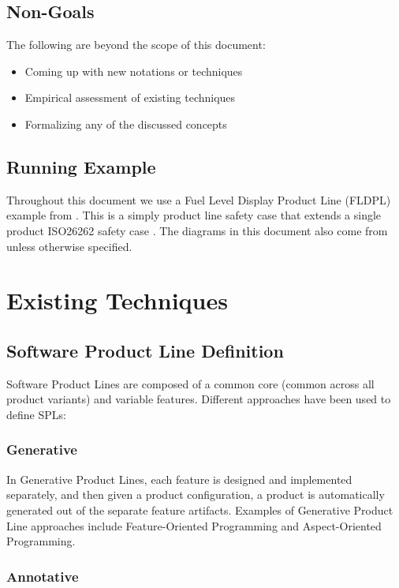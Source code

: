 \documentclass[11pt]{article}
\begin{document}
\subsection{Non-Goals} 

The following are beyond the scope of this document:

\begin{itemize}
\item Coming up with new notations or techniques
\item Empirical assessment of existing techniques
\item Formalizing any of the discussed concepts
\end{itemize}

\subsection{Running Example}

Throughout this document we use a Fuel Level Display Product Line (FLDPL) example from \cite{Gallucci_2013}. This is a simply product line safety case that extends a single product ISO26262 safety case \cite{Dardar_2014}. The diagrams in this document also come from \cite{Gallucci_2013} unless otherwise specified.

\section{Existing Techniques}

\subsection{Software Product Line Definition}

Software Product Lines are composed of a common core (common across all product variants) and variable features. Different approaches have been used to define SPLs:

\subsubsection{Generative}

In Generative Product Lines, each feature is designed and implemented separately, and then given a product configuration, a product is automatically generated out of the separate feature artifacts. Examples of Generative Product Line approaches include Feature-Oriented Programming and Aspect-Oriented Programming.

\subsubsection{Annotative}
\end{document}
